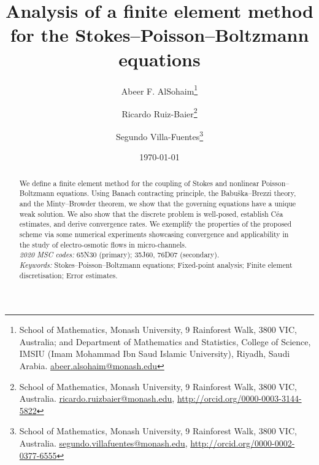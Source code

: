 \documentclass[12pt,a4paper]{article}
\title{Analysis of a finite element method for the Stokes--Poisson--Boltzmann equations}
\author{Abeer F. AlSohaim\thanks{School of Mathematics, Monash University, 9 Rainforest Walk, 3800 VIC, Australia; and Department of Mathematics and Statistics, College of Science, IMSIU (Imam Mohammad Ibn Saud Islamic University), Riyadh, Saudi Arabia.   \protect\url{abeer.alsohaim@monash.edu}
} \and 
  Ricardo Ruiz-Baier\thanks{School of Mathematics, Monash University, 9 Rainforest Walk, 3800 VIC, Australia.
\protect\url{ricardo.ruizbaier@monash.edu}, \protect\url{http://orcid.org/0000-0003-3144-5822}}
 \and 
Segundo Villa-Fuentes\thanks{School of Mathematics, Monash University, 9 Rainforest Walk, 3800 VIC, Australia.  \protect\url{segundo.villafuentes@monash.edu},
\protect\url{http://orcid.org/0000-0002-0377-6555}}
}
\date{\today}
\numberwithin{equation}{section}
\numberwithin{figure}{section}
\numberwithin{table}{section}
\numberwithin{lemma}{section}
\begin{document}
\maketitle

\begin{abstract} We define a finite element method for the coupling of Stokes and nonlinear Poisson--Boltzmann equations. Using Banach contracting  principle, the Babu\v{s}ka--Brezzi theory, and the Minty--Browder theorem, we show that the governing equations have a unique weak solution. We also show that the discrete problem is well-posed,  establish C\'ea estimates, and derive convergence rates. We exemplify the properties of the proposed scheme via some numerical experiments showcasing convergence and applicability in the study of electro-osmotic flows in micro-channels.  \\

\noindent\emph{2020 MSC codes:} 65N30 (primary);  35J60, 76D07 (secondary).\\

\noindent\emph{Keywords:} Stokes--Poisson--Boltzmann equations; Fixed-point analysis; Finite element discretisation; Error estimates.
\end{abstract}


\end{document}
